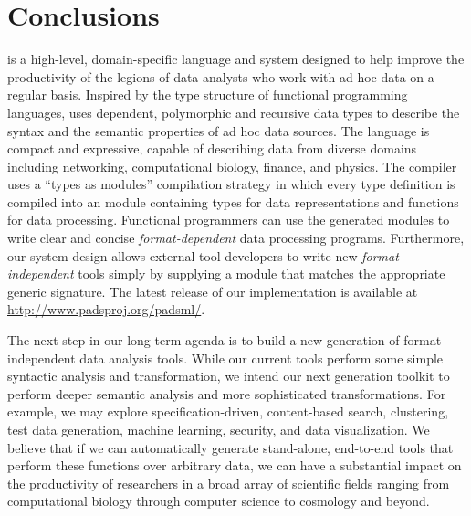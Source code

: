 \section{Conclusions}
\label{sec:future}

\padsml{} is a high-level, domain-specific language and system
designed to help improve the productivity of the legions of data analysts
who work with ad hoc data on a regular basis.  
Inspired by the type structure of functional
programming languages, \padsml{} uses dependent,
polymorphic and recursive data types to describe the syntax and 
the semantic properties of ad hoc data sources.  The language 
is compact and expressive, capable of describing data from diverse 
domains including networking, computational biology, finance, and physics. 
The \padsml{} compiler uses a ``types as modules'' compilation strategy
in which every \padsml{} type definition is compiled into
an \ocaml{} module containing types for data representations
and functions for data processing.  Functional programmers
can use the generated modules to write clear and concise {\em format-dependent}
data processing programs.  Furthermore, our system design
allows external tool developers to write new {\em format-independent} tools
simply by supplying a module that matches the appropriate generic
signature.  The latest release of our implementation is available
at \url{http://www.padsproj.org/padsml/}.

The next step in our long-term agenda is to build a new generation of
format-independent data analysis tools.  While our current tools
perform some simple syntactic analysis and transformation, we intend
our next generation toolkit to perform deeper semantic analysis and
more sophisticated transformations.  For example, we may explore
specification-driven, content-based search, clustering, test data
generation, machine learning, security, and data visualization.  We
believe that if we can automatically generate stand-alone, end-to-end
tools that perform these functions over arbitrary data, we can have a
substantial impact on the productivity of researchers in a broad array
of scientific fields ranging from computational biology through
computer science to cosmology and beyond.
